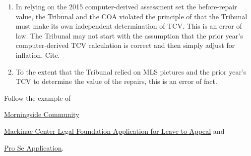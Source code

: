 \documentclass[12pt,\documentclassflag]{michiganCourtOfAppealsBrief}
\begin{document}
\begin{todolist}
\begin{enumerate}
    \item In relying on the 2015 computer-derived assessment set the before-repair value, the Tribunal and the COA violated the principle of \cite{Jones & Laughlin} that the Tribunal must make its own independent determination of TCV. This is an error of law. The Tribunal may not start with the assumption that the prior year's computer-derived TCV calculation is correct and then simply adjust for inflation. Cite.
      
    \item To the extent that the Tribunal relied on MLS pictures and the prior year's TCV to determine the value of the repairs, this is an error of fact. 

    \end{enumerate}
  \item Follow the example of
  \begin{todolist}
  \item \href{https://www.naacpldf.org/files/about-us/2017-11-1%20MorningSide%20v.%20Sabree%20Leave%20Application%20-%20Final.pdf}{Morningside Community}
      \item \href{https://www.mackinac.org/archives/2010/ApplicationforLeavetoAppealtoMSC.pdf}{Mackinac Center Legal Foundation Application for Leave to Appeal} and
      \item  \href{https://courts.michigan.gov/Courts/MichiganSupremeCourt/Clerks/ClerksOfficeDocuments/Pro-Per_MI-Sup-Ct_Civil-Application_05-2017_FillableForm.pdf}{Pro Se Application}.
      \end{todolist}





\end{todolist}
\end{document}
